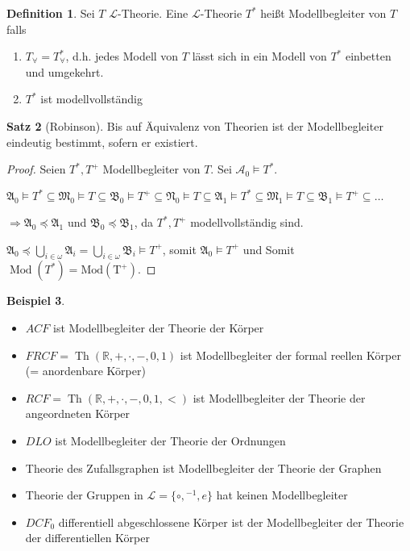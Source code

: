 \documentclass[12pt,parskip=full]{scrartcl}
\newcommand{\setR}{\mathbb{R}}
\theoremstyle{definition}
\newtheorem{theorem}{Satz}[section]
\newtheorem{definition}[theorem]{Definition}
\newtheorem{example}[theorem]{Beispiel}
\begin{document}
	\begin{definition}
		Sei $T$ $\mathcal{L}$-Theorie. Eine $\mathcal{L}$-Theorie $T^*$ heißt Modellbegleiter von $T$ falls
		\begin{enumerate}
			\item $T_\forall = T_\forall^*$, d.h. jedes Modell von $T$ lässt sich in ein Modell von $T^*$ einbetten und umgekehrt.
			\item $T^*$ ist modellvollständig
		\end{enumerate}
	\end{definition}

	\begin{theorem}[Robinson]
		Bis auf Äquivalenz von Theorien ist der Modellbegleiter eindeutig bestimmt, sofern er existiert.
	\end{theorem}

	\begin{proof}
		Seien $T^*, T^+$ Modellbegleiter von $T$. Sei $\mathcal{A}_0 \models T^*$.
		
		$\mathfrak{A}_0 \models T^* \subseteq \mathfrak{M}_0 \models T \subseteq \mathfrak{B}_0 \models T^+ \subseteq \mathfrak{N}_0 \models T \subseteq \mathfrak{A}_1 \models T^* \subseteq \mathfrak{M}_1 \models T \subseteq \mathfrak{B}_1 \models T^+ \subseteq \dots$
		
		$\Rightarrow \mathfrak{A}_0 \preccurlyeq \mathfrak{A}_1$ und $\mathfrak{B}_0 \preccurlyeq \mathfrak{B}_1$, da $T^*, T^+$ modellvollständig sind.
		
		$\mathfrak{A}_0 \preccurlyeq \bigcup_{i \in \omega} \mathfrak{A}_i = \bigcup_{i \in \omega} \mathfrak{B}_i \models T^+$, somit $\mathfrak{A}_0 \models T^+$ und Somit $\operatorname{Mod}(T^*) = \operatorname{Mod(T^+)}$.
	\end{proof}

	\begin{example}
		\begin{itemize}
			\item $ACF$ ist Modellbegleiter der Theorie der Körper
			\item $FRCF = \operatorname{Th}(\setR, +, \cdot, - , 0, 1)$ ist Modellbegleiter der formal reellen Körper (= anordenbare Körper)
			\item $RCF = \operatorname{Th}(\setR, +, \cdot, -, 0, 1, <)$ ist Modellbegleiter der Theorie der angeordneten Körper
			\item $DLO$ ist Modellbegleiter der Theorie der Ordnungen
			\item Theorie des Zufallsgraphen ist Modellbegleiter der Theorie der Graphen
			\item Theorie der Gruppen in $\mathcal{L} = \{ \circ, {}^{-1}, e \}$ hat keinen Modellbegleiter
			\item $DCF_0$ differentiell abgeschlossene Körper ist der Modellbegleiter der Theorie der differentiellen Körper
		\end{itemize}
	\end{example}
\end{document}
